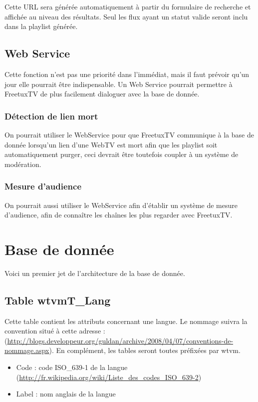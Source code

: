 \documentclass[10pt,a4paper]{article}
\begin{document}
Cette URL sera générée automatiquement à partir du formulaire de recherche et affichée au niveau des résultats. Seul les flux ayant un statut valide seront inclu dans la playlist générée.

\subsection{Web Service}

Cette fonction n'est pas une priorité dans l'immédiat, mais il faut prévoir qu'un jour elle pourrait être indispensable. Un Web Service pourrait permettre à FreetuxTV de plus facilement dialoguer avec la base de donnée.

\subsubsection{Détection de lien mort}

On pourrait utiliser le WebService pour que FreetuxTV communique à la base de donnée lorsqu'un lien d'une WebTV est mort afin que les playlist soit automatiquement purger, ceci devrait être toutefois coupler à un système de modération.

\subsubsection{Mesure d'audience}

On pourrait aussi utiliser le WebService afin d'établir un système de mesure d'audience, afin de connaître les chaînes les plus regarder avec FreetuxTV.

\section{Base de donnée}

Voici un premier jet de l'architecture de la base de donnée.

\subsection{Table wtvmT\_Lang}

Cette table contient les attributs concernant une langue. Le nommage suivra la convention situé à cette adresse : (\url{http://blogs.developpeur.org/guldan/archive/2008/04/07/conventions-de-nommage.aspx}). En complément, les tables seront toutes préfixées par wtvm. 

\begin{itemize}
\item Code : code ISO\_639-1 de la langue (\url{http://fr.wikipedia.org/wiki/Liste\_des\_codes\_ISO\_639-2})
\item Label : nom anglais de la langue
\end{itemize}
\end{document}
